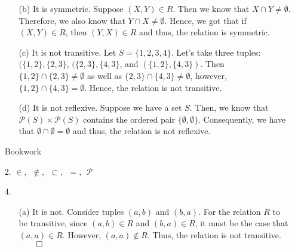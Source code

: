 \documentclass[12pt, a4paper]{article}
\newcommand\und[1]{\underline{\smash{#1}}}
\begin{document}
\begin{itemize}
\begin{itemize}
\item[]

\item[(b)]
It is symmetric. Suppose $(X, Y) \in R$. Then we know that $X \cap Y \neq \emptyset$. Therefore,
we also know that $Y \cap X \neq \emptyset$. Hence, we got that if $(X, Y) \in R$, then $(Y, X) \in R$
and thus, the relation is symmetric.

\item[]

\item[(c)]
It is not transitive. Let $S = \{1, 2, 3, 4\}$. Let's take three tuples: $(\{1, 2\}, \{2, 3\}$, 
$(\{2, 3\}, \{4, 3\}$, and $(\{1, 2\}, \{4, 3\})$. Then $\{1, 2\} \cap \{2, 3\} \neq \emptyset$ as well as $\{2, 3\} \cap \{4, 3\} \neq \emptyset$,
however, $\{1, 2\} \cap \{4, 3\} = \emptyset$. Hence, the relation is not transitive.

\item[]

\item[(d)]
It is not reflexive. Suppose we have a set $S$. Then, we know that $\mathcal{P}(S) \times \mathcal{P}(S)$ contains the ordered pair $\{\emptyset, \emptyset\}$.
Consequently, we have that $\emptyset \cap \emptyset = \emptyset$ and thus, the relation is not reflexive.

\end{itemize}

\newpage

{\Large Bookwork}
\item[]
\item[]

{\Large \textbf{\und{4.2}}}

\item[]

\item[2.]
$\in, \ \ \notin, \ \ \subset, \ \ =, \ \ \mathcal{P}$

\item[]
\item[]

\item[4.]
\begin{itemize}
\item[(a)]
It is not. Consider tuples $(a, b)$ and $(b, a)$. For the relation $R$
to be transitive, since $(a, b) \in R$ and $(b, a) \in R$, it must be the
case that $(a, a) \in R$. However, $(a, a) \notin R$. Thus, the relation is not transitive.
$\qed$

\item[]


\end{itemize}
\end{itemize}
\end{document}
